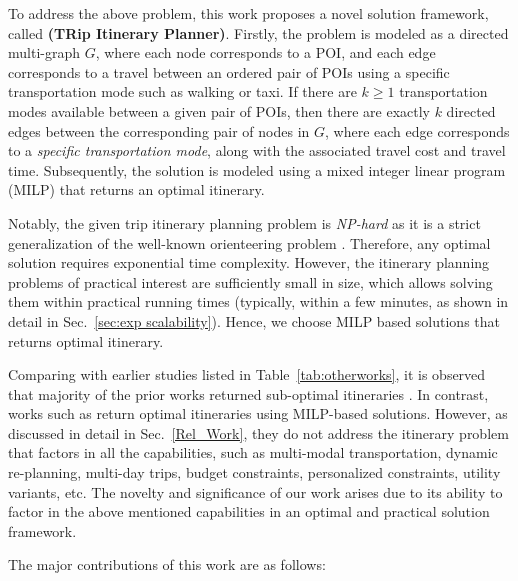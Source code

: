 To address the above problem, this work proposes a novel solution framework,  called \textbf{\trip (TRip Itinerary Planner)}.  Firstly, the problem is modeled as a directed multi-graph $G$, where each node corresponds to a POI, and each edge corresponds to a travel between an ordered pair of POIs using a specific transportation mode such as walking or taxi. If there are $k \ge 1$ transportation modes available between a given pair of POIs, then there are exactly $k$ directed edges between the corresponding pair of nodes in $G$, where each edge corresponds to a \emph{specific transportation mode}, along with the associated travel cost and travel time. Subsequently, the solution is modeled using a mixed integer linear program (MILP) that returns an optimal itinerary. 

Notably, the given trip itinerary planning problem is \emph{NP-hard} as it is a strict generalization of the well-known orienteering problem \citep{vansteenwegen2011orienteering, gunawan2016orienteering, vansteenwegen2019orienteering}. Therefore, any optimal solution requires exponential time complexity. However, the itinerary planning problems of practical interest are sufficiently small in size, which allows solving them within practical running times (typically, within a few minutes, as shown in detail in Sec.~\ref{sec:exp scalability}). Hence, we choose MILP based solutions that returns optimal itinerary.

Comparing with earlier studies listed in Table~\ref{tab:otherworks}, it is observed that majority of the prior works returned sub-optimal itineraries \citep{bolzoni2014efficient, lim2018personalized, panagiotakis2024expectation, vu2022branch}. In contrast, works such as \citep{rambha2024optimized, taylor2018tour, vanzelst2016itinerary} return optimal itineraries using MILP-based solutions. However, as discussed in detail in Sec.~\ref{Rel_Work}, they do not address the itinerary problem that factors in all the capabilities, such as multi-modal transportation, dynamic re-planning, multi-day trips, budget constraints, personalized constraints, utility variants, etc.
The novelty and significance of our work arises due to its ability to factor in the above mentioned capabilities in an optimal and practical solution framework.

The major contributions of this work are as follows:

